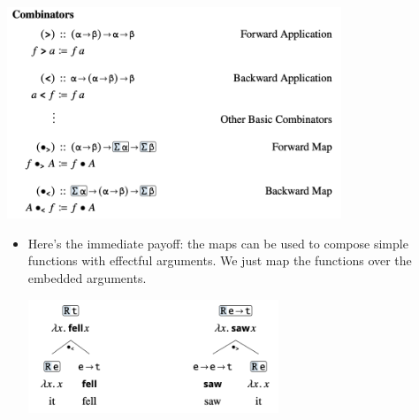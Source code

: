 \documentclass{article}
\begin{document}
\begin{center}
  \includegraphics[width=10cm]{clips/4.png}
\end{center}

\begin{itemize}
  \item Here's the immediate payoff: the maps can be used to compose simple functions with effectful arguments.
    We just map the functions over the embedded arguments.
  \begin{exe}
    \ex \hfill \begin{center}
      \includegraphics[width=7.5cm]{clips/8.png}
    \end{center}
  \end{exe}
\end{itemize}
\end{document}
